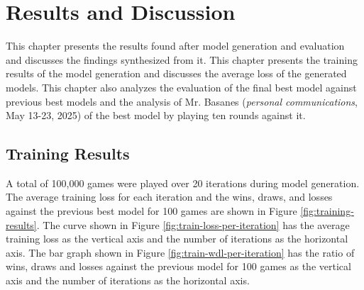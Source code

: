 \chapter{Results and Discussion}

This chapter presents the results found after model generation and evaluation and discusses the findings synthesized from it. This chapter presents the training results of the model generation and discusses the average loss of the generated models. This chapter also analyzes the evaluation of the final best model against previous best models and the analysis of Mr. Basanes (\textit{personal communications}, May 13-23, 2025) of the best model by playing ten rounds against it.

\section{Training Results}

A total of 100,000 games were played over 20 iterations during model generation. The average training loss for each iteration and the wins, draws, and losses against the previous best model for 100 games are shown in Figure \ref{fig:training-results}. The curve shown in Figure \ref{fig:train-loss-per-iteration} has the average training loss as the vertical axis and the number of iterations as the horizontal axis. The bar graph shown in Figure \ref{fig:train-wdl-per-iteration} has the ratio of wins, draws and losses against the previous model for 100 games as the vertical axis and the number of iterations as the horizontal axis.

\wdltraindata

